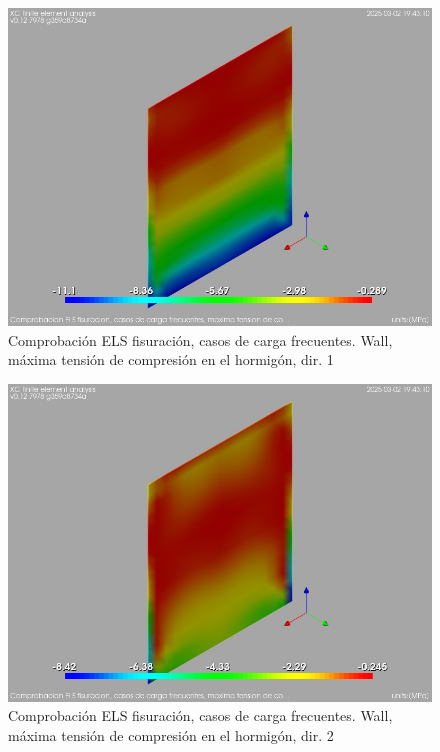 \begin{figure}[ht]
\begin{center}
\includegraphics[width=\linewidth]{results/graphics/crackingSLS_freq/wallsigma_cSect1}
\caption{Comprobación ELS fisuración, casos de carga frecuentes. Wall, máxima tensión de compresión en el hormigón, dir. 1}
\label{SLS_frequentLoadsCrackControlwallsigma_cSect1}
\end{center}
\end{figure}
\begin{figure}[ht]
\begin{center}
\includegraphics[width=\linewidth]{results/graphics/crackingSLS_freq/wallsigma_cSect2}
\caption{Comprobación ELS fisuración, casos de carga frecuentes. Wall, máxima tensión de compresión en el hormigón, dir. 2}
\label{SLS_frequentLoadsCrackControlwallsigma_cSect2}
\end{center}
\end{figure}
